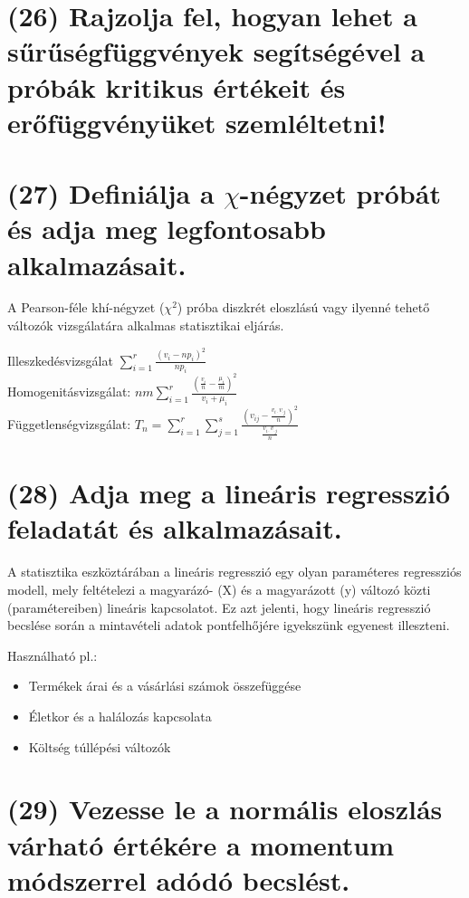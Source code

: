 \documentclass[12p]{article}
\begin{document}
\section{(26) Rajzolja fel, hogyan lehet a sűrűségfüggvények segítségével a próbák kritikus értékeit és erőfüggvényüket szemléltetni!}

\section{(27) Definiálja a $\chi$-négyzet próbát és adja meg legfontosabb alkalmazásait.}

A Pearson-féle khí-négyzet ($\chi^2$) próba diszkrét eloszlású vagy ilyenné tehető változók vizsgálatára alkalmas statisztikai eljárás.

Illeszkedésvizsgálat $\displaystyle{\sum_{i=1}^r \frac{(v_i - np_i)^2}{np_i}}$\\
Homogenitásvizsgálat: $\displaystyle{nm \sum_{i=1}^r \frac{(\frac{v_i}{n}-\frac{\mu_i}{m})^2}{v_i + \mu_i}}$\\
Függetlenségvizsgálat: $\displaystyle{T_n = \sum_{i=1}^r \sum_{j=1}^s 
\frac{(v_{ij} - \frac{v_{i\cdot}v_{\cdot j}}{n})^2
}{\frac{v_{i\cdot}v_{\cdot j}}{n}}}$

\section{(28) Adja meg a lineáris regresszió feladatát és alkalmazásait.}

A statisztika eszköztárában a lineáris regresszió egy olyan paraméteres regressziós modell, mely feltételezi a magyarázó- (X) és a magyarázott (y) változó közti (paramétereiben) lineáris kapcsolatot. Ez azt jelenti, hogy lineáris regresszió becslése során a mintavételi adatok pontfelhőjére igyekszünk egyenest illeszteni.

Használható pl.:

\begin{itemize}
	\item Termékek árai és a vásárlási számok összefüggése
	\item Életkor és a halálozás kapcsolata
	\item Költség túllépési változók
\end{itemize}

\section{(29) Vezesse le a normális eloszlás várható értékére a momentum módszerrel adódó becslést.}
\end{document}
